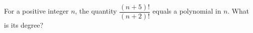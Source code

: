 For a positive integer $n$, the quantity $\dfrac{(n+5)!}{(n+2)!}$ equals a polynomial in $n$. What is its degree?

